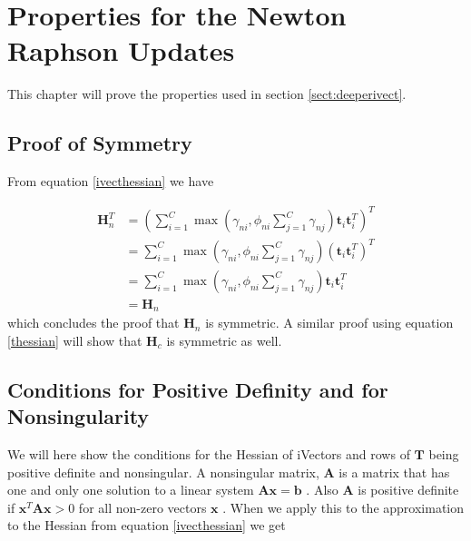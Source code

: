 \chapter{Properties for the Newton Raphson Updates}

This chapter will prove the properties used in section \ref{sect:deeperivect}. 


\section{Proof of Symmetry}
\label{symproof}

From equation \ref{ivecthessian} we have

\begin{align*}
\mathbf{H}_n^T &= \left(\sum_{i=1}^{C}\max(\gamma_{ni}, \phi_{ni}\sum_{j=1}^{C}\gamma_{nj})\mathbf{t}_i\mathbf{t}_i^T\right)^T \\
 &= \sum_{i=1}^{C}\max(\gamma_{ni}, \phi_{ni}\sum_{j=1}^{C}\gamma_{nj})\left(\mathbf{t}_i\mathbf{t}_i^T\right)^T \\
 &= \sum_{i=1}^{C}\max(\gamma_{ni}, \phi_{ni}\sum_{j=1}^{C}\gamma_{nj})\mathbf{t}_i\mathbf{t}_i^T \\
 &= \mathbf{H}_n
\end{align*}
which concludes the proof that $\mathbf{H}_n$ is symmetric. A similar proof using equation \ref{thessian} will show that $\mathbf{H}_c$ is symmetric as well.




\section{Conditions for Positive Definity and for Nonsingularity}
\label{posdefproof}
We will here show the conditions for the Hessian of iVectors and rows of $\mathbf{T}$ being positive definite and nonsingular. A nonsingular matrix, $\mathbf{A}$ is a matrix that has one and only one solution to a linear system $\mathbf{Ax}=\mathbf{b}$ \cite[p. 54]{matte3}. Also $\mathbf{A}$ is positive definite if $\mathbf{x}^T\mathbf{Ax} > 0$ for all non-zero vectors $\mathbf{x}$ \cite[p. 246]{matte3}. When we apply this to the approximation to the Hessian from equation \ref{ivecthessian} we get


